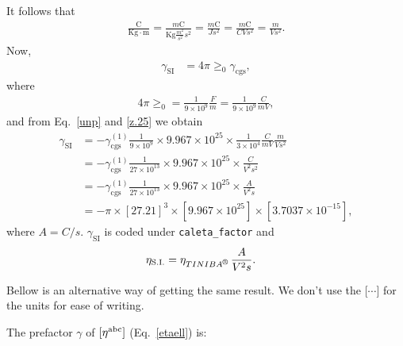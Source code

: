 \documentclass[12pt]{article}
\numberwithin{equation}{section}
\begin{document}
\begin{enumerate}
It follows that
\begin{align}\label{z.25}
\frac{\mathrm{C}}{\mathrm{Kg}\cdot\mathrm{m}}
=
\frac{m\mathrm{C}}{\mathrm{Kg}\frac{m^2}{s^2} s^2}
=
\frac{m\mathrm{C}}{J s^2}
=
\frac{m\mathrm{C}}{CV s^2}
=
\frac{m}{V s^2}
.
\end{align}
Now, 
\begin{align}\label{z.26}
\gamma_{\mathrm{SI}}
&=4\pi\ge_0  
\gamma_{\mathrm{cgs}}
,
\end{align}
where
\begin{align}\label{z.27}
4\pi\ge_0=\frac{1}{9\times 10^9}\frac{F}{m}
=\frac{1}{9\times 10^9}\frac{C}{mV}
,
\end{align}
and from Eq.~\eqref{unp} and \eqref{z.25} we obtain
\begin{align}\label{z.28}
\gamma_{\mathrm{SI}}
&=-
\gamma^{(1)}_{\mathrm{cgs}}
\frac{1}{9\times 10^9}
\times 
9.967\times 10^{25}\times 
\frac{1}{3\times 10^{4}}
\frac{C}{mV}
\frac{m}{V s^2}
\nonumber\\
&=-
\gamma^{(1)}_{\mathrm{cgs}}
\frac{1}{27\times 10^{13}}
\times 
9.967\times 10^{25}\times 
\frac{C}{V^2 s^2}
\nonumber\\
&=-
\gamma^{(1)}_{\mathrm{cgs}}
\frac{1}{27\times 10^{13}}
\times 
9.967\times 10^{25}\times 
\frac{A}{V^2 s}
\nonumber\\
&=-
\pi  
\times  
[27.21]^3  
\times  
[9.967\times 10^{25}]
\times[3.7037\times 10^{-15}]
,
\end{align}
where $A=C/s$.
$\gamma_{\mathrm{SI}}$ is coded under \verb=caleta_factor=
and 
\begin{align}\label{u_eta_ecn}
\eta_{\mathrm{S.I.}}
&=\eta_{\tiniba}\,
\frac{A}{V^2 s}
. 
\end{align}

Bellow is an alternative way of getting the same result.
We don't use the [$\cdots$]
for the units for ease of writing.

The prefactor $\gamma$ of  
$[\eta^{\mathrm{a}\mathrm{b}\mathrm{c}}]$ (Eq.~\eqref{etaell}) is:


\end{enumerate}
\end{document}
